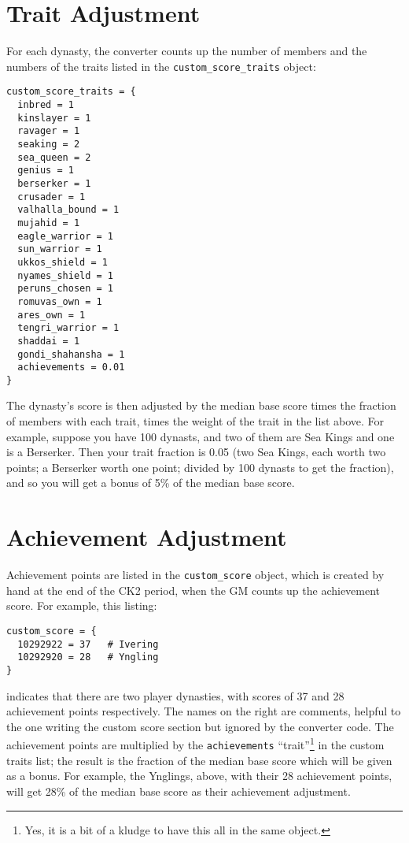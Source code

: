 \documentclass[12pt]{article}
\begin{document}
\section{Trait Adjustment}

For each dynasty, the
converter counts up the number of members and the numbers of the
traits listed in the \verb|custom_score_traits| object:

\begin{verbatim}
custom_score_traits = {
  inbred = 1
  kinslayer = 1
  ravager = 1
  seaking = 2
  sea_queen = 2
  genius = 1
  berserker = 1
  crusader = 1
  valhalla_bound = 1
  mujahid = 1
  eagle_warrior = 1
  sun_warrior = 1
  ukkos_shield = 1
  nyames_shield = 1
  peruns_chosen = 1
  romuvas_own = 1
  ares_own = 1
  tengri_warrior = 1
  shaddai = 1
  gondi_shahansha = 1
  achievements = 0.01
}
\end{verbatim}

The dynasty's score is then adjusted by the median base score times
the fraction of members with each trait, times the weight of the trait
in the list above. For example, suppose you have 100 dynasts, and two
of them are Sea Kings and one is a Berserker. Then your trait fraction
is 0.05 (two Sea Kings, each worth two points; a Berserker worth one
point; divided by 100 dynasts to get the fraction), and so you will
get a bonus of 5\% of the median base score.

\section{Achievement Adjustment}

Achievement points are listed in the \verb|custom_score| object, which
is created by hand at the end of the CK2 period, when the GM counts up
the achievement score. For example, this listing:
\begin{verbatim}
custom_score = {
  10292922 = 37   # Ivering
  10292920 = 28   # Yngling
}
\end{verbatim}
indicates that there are two player dynasties, with scores of 37 and
28 achievement points respectively. The names on the right are
comments, helpful to the one writing the custom score section but
ignored by the converter code. The achievement points are multiplied
by the \verb|achievements| ``trait''\footnote{Yes, it is a bit of a
kludge to have this all in the same object.} in the custom traits
list; the result is the fraction of the median base score which will
be given as a bonus. For example, the Ynglings, above, with their 28
achievement points, will get 28\% of the median base score as their
achievement adjustment.
\end{document}
